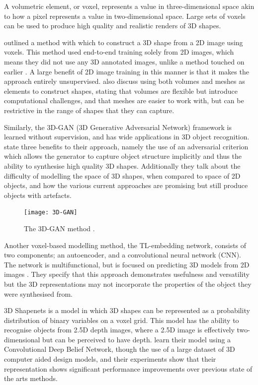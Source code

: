 A volumetric element, or voxel, represents a value in three-dimensional space akin to how a pixel represents a value in two-dimensional space. Large sets of voxels can be used to produce high quality and realistic renders of 3D shapes.

\citet{2016unsuplearning} outlined a method with which to construct a 3D shape from a 2D image using voxels. This method used end-to-end training solely from 2D images, which means they did not use any 3D annotated images, unlike a method touched on earlier \citep{2016singleimageinterpreter}. A large benefit of 2D image training in this manner is that it makes the approach entirely unsupervised. \citet{2016unsuplearning} also discuss using both volumes and meshes as elements to construct shapes, stating that volumes are flexible but introduce computational challenges, and that meshes are easier to work with, but can be restrictive in the range of shapes that they can capture.

Similarly, the 3D-GAN (3D Generative Adversarial Network) framework is learned without supervision, and has wide applications in 3D object recognition. \citet{2016problatent} state three benefits to their approach, namely the use of an adversarial criterion which allows the generator to capture object structure implicitly and thus the ability to synthesise high quality 3D shapes. Additionally they talk about the difficulty of modelling the space of 3D shapes, when compared to space of 2D objects, and how the various current approaches are promising but still produce objects with artefacts.

\begin{figure}[th]
  \centering
  \texttt{[image: 3D-GAN]}
  \caption{The 3D-GAN method \protect\citep{2016problatent}.}
  \label{fig:3dgan}
\end{figure}

Another voxel-based modelling method, the TL-embedding network, consists of two components; an autoencoder, and a convolutional neural network (CNN). The network is multifunctional, but is focused on predicting 3D models from 2D images \citep{2016predictgenerativevector}. They specify that this approach demonstrates usefulness and versatility but the 3D representations may not incorporate the properties of the object they were synthesised from.

3D Shapenets \citep{20153dshapenets} is a model in which 3D shapes can be represented as a probability distribution of binary variables on a voxel grid. This model has the ability to recognise objects from 2.5D depth images, where a 2.5D image is effectively two-dimensional but can be perceived to have depth. \citet{20153dshapenets} learn their model using a Convolutional Deep Belief Network, though the use of a large dataset of 3D computer aided design models, and their experiments show that their representation shows significant performance improvements over previous state of the arts methods.

